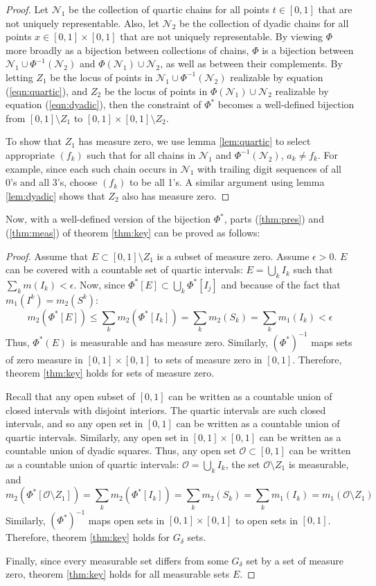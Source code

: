 \documentclass[letterpaper,12pt,fleqn,reqno]{amsart}
\newcommand{\uint}{[0,1]}
\newcommand{\usq}{\uint\times\uint}
\newcommand{\pn}{\mathcal{N}}
\newcommand{\po}{\mathcal{O}}
\theoremstyle{plain}
\begin{document}
\begin{proof}
Let $\pn_1$ be the collection of quartic chains for all points $t\in\uint$ that
are not uniquely representable. Also, let $\pn_2$ be the collection of dyadic
chains for all points $x\in\usq$ that are not uniquely representable. By
viewing $\Phi$ more broadly as a bijection between collections of chains,
$\Phi$ is a bijection between $\pn_1\cup\Phi^{-1}(\pn_2)$ and
$\Phi(\pn_1)\cup\pn_2$, as well as between their complements. By letting $Z_1$
be the locus of points in $\pn_1\cup\Phi^{-1}(\pn_2)$ realizable by equation
(\ref{eqn:quartic}), and $Z_2$ be the locus of points in $\Phi(\pn_1)\cup\pn_2$
realizable by equation (\ref{eqn:dyadic}), then the constraint of $\Phi^*$
becomes a well-defined bijection from $\uint\setminus Z_1$ to
$\usq\setminus Z_2$.

To show that $Z_1$ has measure zero, we use lemma \ref{lem:quartic} to select
appropriate $(f_k)$ such that for all chains in $\pn_1$ and $\Phi^{-1}(\pn_2)$,
$a_k\ne f_k$. For example, since each such chain occurs in $\pn_1$ with
trailing digit sequences of all 0's and all 3's, choose $(f_k)$ to be all 1's.
A similar argument using lemma \ref{lem:dyadic} shows that $Z_2$ also has
measure zero.
\end{proof}

Now, with a well-defined version of the bijection $\Phi^*$, parts
(\ref{thm:pres}) and (\ref{thm:meas}) of theorem \ref{thm:key} can be
proved as follows:

\begin{proof}
Assume that $E\subset\uint\setminus Z_1$ is a subset of measure zero. Assume
$\epsilon>0$. $E$ can be covered with a countable set of quartic intervals:
$E=\bigcup_{k}I_k$ such that $\sum_km(I_k)<\epsilon$. Now, since
$\Phi^*[E]\subset\bigcup_k\Phi^*[I_j]$ and because of the fact that
$m_1(I^k)=m_2(S^k)$:
\[m_2(\Phi^*[E])\le\sum_km_2(\Phi^*[I_k])=\sum_km_2(S_k)=\sum_km_1(I_k)<\epsilon\]
Thus, $\Phi^*(E)$ is measurable and has measure zero. Similarly, $(\Phi^*)^{-1}$
maps sets of zero measure in $\usq$ to sets of measure zero in $\uint$.
Therefore, theorem \ref{thm:key} holds for sets of measure zero.

Recall that any open subset of $\uint$ can be written as a countable union of
closed intervals with disjoint interiors. The quartic intervals are such closed
intervals, and so any open set in $\uint$ can be written as a countable union
of quartic intervals. Similarly, any open set in $\usq$ can be written as a
countable union of dyadic squares. Thus, any open set $\po\subset\uint$ can be
written as a countable union of quartic intervals: $\po=\bigcup_kI_k$, the set
$\po\setminus Z_1$ is measurable, and
\[m_2(\Phi^*[\po\setminus Z_1])=\sum_km_2(\Phi^*[I_k])=\sum_km_2(S_k)=
    \sum_km_1(I_k)=m_1(\po\setminus Z_1)\]
Similarly, $(\Phi^*)^{-1}$ maps open sets in $\usq$ to open sets in $\uint$.
Therefore, theorem \ref{thm:key} holds for $G_{\delta}$ sets.

Finally, since every measurable set differs from some $G_{\delta}$ set by a set
of measure zero, theorem \ref{thm:key} holds for all measurable sets $E$.
\end{proof}
\end{document}
